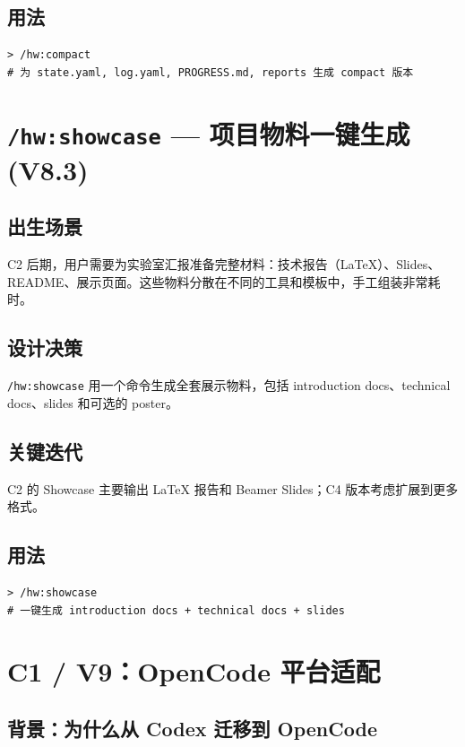 \documentclass[
  outputdir=build,
  chapterstyle=cn,
  colorscheme=Simple,
  fontset=tech,
  code=false
]{Hypo-Note}
\begin{document}
\subsection{用法}

\begin{lstlisting}[caption=生成紧凑视图]
> /hw:compact
# 为 state.yaml, log.yaml, PROGRESS.md, reports 生成 compact 版本
\end{lstlisting}

\section{\texttt{/hw:showcase} — 项目物料一键生成 (V8.3)}

\subsection{出生场景}

C2 后期，用户需要为实验室汇报准备完整材料：技术报告（LaTeX）、Slides、README、展示页面。这些物料分散在不同的工具和模板中，手工组装非常耗时。

\subsection{设计决策}

\texttt{/hw:showcase} 用一个命令生成全套展示物料，包括 introduction docs、technical docs、slides 和可选的 poster。

\subsection{关键迭代}

C2 的 Showcase 主要输出 LaTeX 报告和 Beamer Slides；C4 版本考虑扩展到更多格式。

\subsection{用法}

\begin{lstlisting}[caption=生成项目展示包]
> /hw:showcase
# 一键生成 introduction docs + technical docs + slides
\end{lstlisting}

\section{C1 / V9：OpenCode 平台适配}

\subsection{背景：为什么从 Codex 迁移到 OpenCode}
\end{document}
